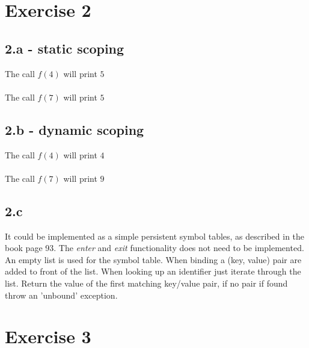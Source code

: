 \documentclass[11pt,a4paper]{article}
\begin{document}
\section{Exercise 2}
\subsection{2.a - static scoping}
The call $f(4)$ will print $5$ \\\\
The call $f(7)$ will print $5$

\subsection{2.b - dynamic scoping}
The call $f(4)$ will print $4$ \\\\
The call $f(7)$ will print $9$

\subsection{2.c}
It could be implemented as a simple persistent symbol tables, as described in
the book page 93. The \emph{enter} and \emph{exit} functionality does
not need to be implemented. An empty list is used for the symbol table. When
binding a (key, value) pair are added to front of the list. When looking up an
identifier just iterate through the list. Return the value of the first
matching key/value pair, if no pair if found throw an 'unbound' exception.

\section{Exercise 3}
\end{document}
